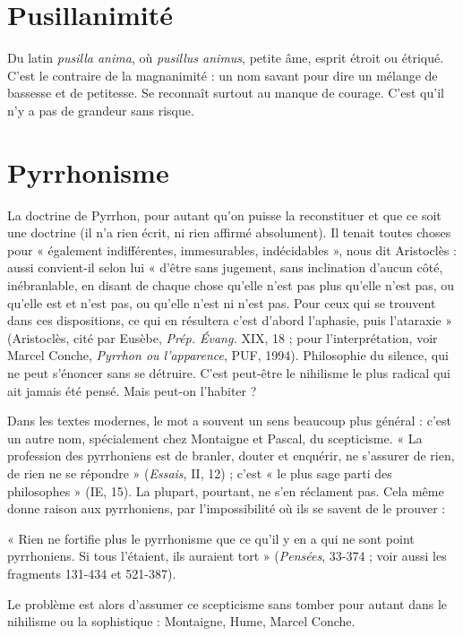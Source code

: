 \section{Pusillanimité}
Du latin {\it pusilla anima}, où {\it pusillus animus}, petite âme,
esprit étroit ou étriqué. C’est le contraire de la
magnanimité : un nom savant pour dire un mélange de bassesse et de petitesse.
Se reconnaît surtout au manque de courage. C’est qu’il n’y a pas de grandeur
sans risque.

\section{Pyrrhonisme}
La doctrine de Pyrrhon, pour autant qu’on puisse la
reconstituer et que ce soit une doctrine (il n’a rien écrit,
ni rien affirmé absolument). Il tenait toutes choses pour « également indifférentes,
immesurables, indécidables », nous dit Aristoclès : aussi convient-il
selon lui « d’être sans jugement, sans inclination d’aucun côté, inébranlable, en
disant de chaque chose qu’elle n’est pas plus qu’elle n’est pas, ou qu’elle est et
n’est pas, ou qu’elle n’est ni n’est pas. Pour ceux qui se trouvent dans ces dispositions,
ce qui en résultera c’est d’abord l’aphasie, puis l’ataraxie » (Aristoclès,
cité par Eusèbe, {\it Prép. Évang.} XIX, 18 ; pour l'interprétation, voir Marcel
Conche, {\it Pyrrhon ou l'apparence}, PUF, 1994). Philosophie du silence, qui ne
peut s’énoncer sans se détruire. C’est peut-être le nihilisme le plus radical qui
ait jamais été pensé. Mais peut-on l’habiter ?

Dans les textes modernes, le mot a souvent un sens beaucoup plus général :
c’est un autre nom, spécialement chez Montaigne et Pascal, du scepticisme.
« La profession des pyrrhoniens est de branler, douter et enquérir, ne s'assurer
de rien, de rien ne se répondre » ({\it Essais}, II, 12) ; c’est « le plus sage parti des
philosophes » (IE, 15). La plupart, pourtant, ne s’en réclament pas. Cela même
donne raison aux pyrrhoniens, par l'impossibilité où ils se savent de le prouver :

« Rien ne fortifie plus le pyrrhonisme que ce qu’il y en a qui ne sont point pyrrhoniens.
Si tous l’étaient, ils auraient tort » ({\it Pensées}, 33-374 ; voir aussi les
fragments 131-434 et 521-387).

Le problème est alors d’assumer ce scepticisme sans tomber pour autant
dans le nihilisme ou la sophistique : Montaigne, Hume, Marcel Conche.
%

